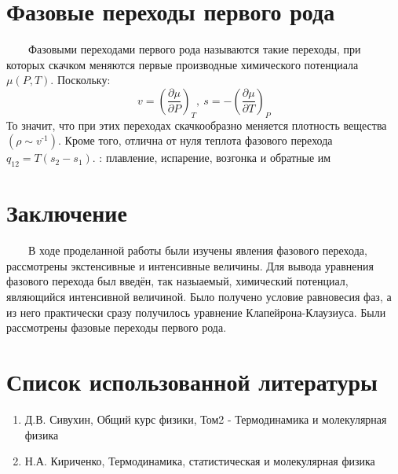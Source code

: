 \documentclass[a4, 12pt]{article}
\begin{document}
\section{Фазовые переходы первого рода}
\ \ \ \ Фазовыми переходами первого рода называются такие переходы, при которых скачком меняются первые производные химического потенциала $\mu(P, T)$. Поскольку:
\begin{equation}
    v = \left(\frac{\partial\mu}{\partial P}\right)_T, \
    s = -\left(\frac{\partial\mu}{\partial T}\right)_P
\end{equation}
То значит, что при этих переходах скачкообразно меняется плотность вещества $(\rho \sim v^\text{-1})$. Кроме того, отлична от нуля теплота фазового перехода
$q_{12} = T(s_2 - s_1)$.
: плавление, испарение, возгонка и обратные им
\section{Заключение}
\ \ \ \ В ходе проделанной работы были изучены явления фазового перехода, рассмотрены экстенсивные и интенсивные величины. Для вывода уравнения фазового перехода был введён, так назыаемый, химический потенциал, являющийся интенсивной величиной. Было получено условие равновесия фаз, а из него практически сразу получилось уравнение Клапейрона-Клаузиуса. Были рассмотрены фазовые переходы первого рода.
\section{Список использованной литературы}
\begin{enumerate}
    \item Д.В. Сивухин, Общий курс физики, Том2 - Термодинамика и молекулярная физика
    \item Н.А. Кириченко, Термодинамика, статистическая и молекулярная физика
\end{enumerate}
\end{document}
